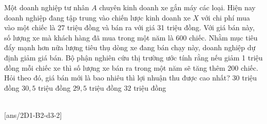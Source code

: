 \begin{ex}
	Một doanh nghiệp tư nhân $A$ chuyên kinh doanh xe gắn máy các loại. Hiện nay doanh nghiệp đang tập trung vào chiến lược kinh doanh xe $X$ với chi phí mua vào một chiếc là 27 triệu đồng và bán ra với giá 31 triệu đồng. Với giá bán này, số lượng xe mà khách hàng đã mua trong một năm là 600 chiếc. Nhằm mục tiêu đẩy mạnh hơn nữa lượng tiêu thụ dòng xe đang bán chạy này, doanh nghiệp dự định giảm giá bán. Bộ phận nghiên cứu thị trường ước tính rằng nếu giảm 1 triệu đồng mỗi chiếc xe thì số lượng xe bán ra trong một năm sẽ tăng thêm 200 chiếc. Hỏi theo đó, giá bán mới là bao nhiêu thì lợi nhuận thu được cao nhất?
	\choice
	{$30$ triệu đồng}
	{\True $30,5$ triệu đồng}
	{$29,5$ triệu đồng}
	{$32$ triệu đồng}
\end{ex}
 \\
[ans/2D1-B2-d3-2]

